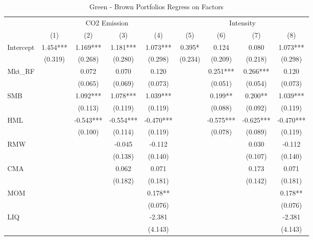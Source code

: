 \documentclass[12pt]{article}
\begin{document}
\begin{table}[!ht]
\centering
\footnotesize
\caption{Green - Brown Portfolios Regress on Factors}
\label{tab: green-brown}
{
\def\sym#1{\ifmmode^{#1}\else\(^{#1}\)\fi}
\begin{tabular}{@{\extracolsep{2pt}}l*{8}{c}@{}}
\toprule
& \multicolumn{4}{c}{CO2 Emission} & \multicolumn{4}{c}{Intensity} \\
\cline{2-5}
\cline{6-9}
               & (1)  & (2)   & (3)   & (4)   & (5) & (6)   & (7)    & (8)     \\
\hline
Intercept      & 1.454*** & 1.169***  & 1.181***  & 1.073***  & 0.395*  & 0.124     & 0.080     & 1.073***   \\
               & (0.319)  & (0.268)   & (0.280)   & (0.298)   & (0.234) & (0.209)   & (0.218)   & (0.298)    \\
Mkt\_RF        &          & 0.072     & 0.070     & 0.120     &         & 0.251***  & 0.266***  & 0.120      \\
               &          & (0.065)   & (0.069)   & (0.073)   &         & (0.051)   & (0.054)   & (0.073)    \\
SMB            &          & 1.092***  & 1.078***  & 1.039***  &         & 0.199**   & 0.200**   & 1.039***   \\
               &          & (0.113)   & (0.119)   & (0.119)   &         & (0.088)   & (0.092)   & (0.119)    \\
HML            &          & -0.543*** & -0.554*** & -0.470*** &         & -0.575*** & -0.625*** & -0.470***  \\
               &          & (0.100)   & (0.114)   & (0.119)   &         & (0.078)   & (0.089)   & (0.119)    \\
RMW            &          &           & -0.045    & -0.112    &         &           & 0.030     & -0.112     \\
               &          &           & (0.138)   & (0.140)   &         &           & (0.107)   & (0.140)    \\
CMA            &          &           & 0.062     & 0.071     &         &           & 0.173     & 0.071      \\
               &          &           & (0.182)   & (0.181)   &         &           & (0.142)   & (0.181)    \\
MOM            &          &           &           & 0.178**   &         &           &           & 0.178**    \\
               &          &           &           & (0.076)   &         &           &           & (0.076)    \\
LIQ            &          &           &           & -2.381    &         &           &           & -2.381     \\
               &          &           &           & (4.143)   &         &           &           & (4.143)    \\


\end{tabular}}
\end{table}
\end{document}
